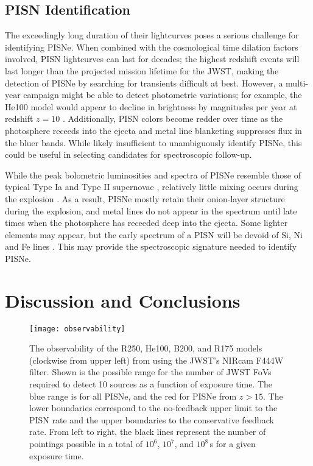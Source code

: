 \documentclass[../thesis.tex]{subfiles}
\begin{document}
\subsection{PISN Identification}
The exceedingly long duration of their lightcurves poses a serious
challenge for identifying PISNe.  When combined with the cosmological
time dilation factors involved, PISN lightcurves can last for decades;
the highest redshift events will last longer than the projected
mission lifetime for the JWST, making the detection of PISNe by
searching for transients difficult at best.  However, a multi-year
campaign might be able to detect photometric variations; for example,
the He100 model would appear to decline in brightness by 
magnitudes per year at redshift $z=10$
\citep{KasenWoosleyHeger2011}. Additionally, PISN colors become redder
over time as the photosphere receeds into the ejecta and metal line
blanketing suppresses flux in the bluer bands.  While likely
insufficient to unambiguously identify PISNe, this could be useful in
selecting candidates for spectroscopic follow-up.

While the peak bolometric luminosities and spectra of PISNe resemble
those of typical Type Ia and Type II supernovae
\citep{JoggerstWhalen2011, KasenWoosleyHeger2011}, relatively little
mixing occurs during the explosion \citep{JoggerstWhalen2011,
  ChenHegerAlmgren2011}.  As a result, PISNe mostly retain their
onion-layer structure during the explosion, and metal lines do not
appear in the spectrum until late times when the photosphere has
receeded deep into the ejecta.  Some lighter elements may appear, but
the early spectrum of a PISN will be devoid of Si, Ni and Fe lines
\citep{JoggerstWhalen2011}. This may provide the spectroscopic
signature needed to identify PISNe.

\section{Discussion and Conclusions}
\label{pisn_conclusions} 
\begin{figure}
\begin{center}
  \texttt{[image: observability]}
  \caption{The observability of the R250, He100, B200,
    and R175 models (clockwise from upper left) from
    \citet{KasenWoosleyHeger2011} using the JWST's NIRcam F444W
    filter. Shown is the possible range for the number of JWST FoVs
    required to detect 10 sources as a function of exposure time. The
    blue range is for all PISNe, and the red for PISNe
    from $z>15$.  The lower boundaries correspond to the
    no-feedback upper limit to the PISN rate and the upper boundaries to
    the conservative feedback rate.  From left to right, the black
    lines represent the number of pointings possible in a total of
    $10^6$, $10^7$, and $10^8\,$s for a given exposure time.}
  \label{observability}
\end{center}
\end{figure}
\end{document}
